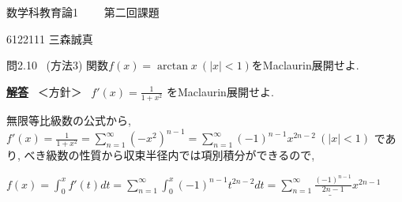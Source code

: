 \documentclass{jsarticle}
\begin{document}
\begin{center}
  数学科教育論1 \ \ \ \ 第二回課題
\end{center}

\begin{flushright}
  6122111 三森誠真
\end{flushright}

\begin{itembox}[l]{問2.10 \ (方法3)}
関数$f(x) = \arctan x \ (|x| < 1)$をMaclaurin展開せよ.
\end{itembox}

\underline{\textbf{解答}}
 \ ＜方針＞ \ $f'(x) = \displaystyle \frac{1}{1+x^2}$ をMaclaurin展開せよ.

無限等比級数の公式から, $f'(x) = \displaystyle \frac{1}{1+x^2} = \displaystyle \sum_{n=1}^{\infty} (-x^2)^{n-1}
= \displaystyle \sum_{n=1}^{\infty} (-1)^{n-1} x^{2n-2} \ (|x| < 1)$ であり, べき級数の性質から収束半径内では項別積分ができるので, 

$f(x) = \displaystyle \int_0^x f'(t) dt = \displaystyle \sum_{n=1}^{\infty} \int_0^x (-1)^{n-1} t^{2n-2} dt
= \underline{\displaystyle \sum_{n=1}^{\infty} \frac{(-1)^{n-1}}{2n-1} x^{2n-1}}$
  
\end{document}
